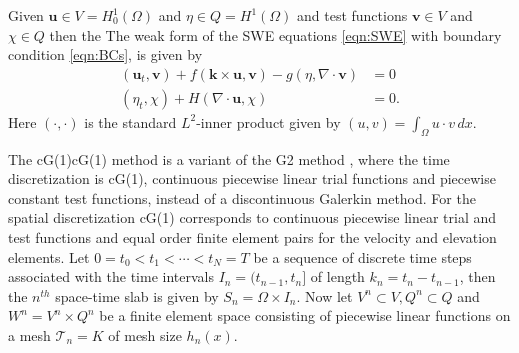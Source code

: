 Given $\mathbf{u} \in V=H^1_0(\Omega)$ and $\eta \in Q=H^1(\Omega)$ and
test functions $\mathbf{v} \in V$ and $\chi \in Q$ then the The weak form of the
SWE equations \eqref{eqn:SWE} with boundary condition \eqref{eqn:BCs}, is given
by
\begin{equation}
  \begin{split}
    (\mathbf{u}_t, \mathbf{v}) + f(\mathbf{k} \times
        \mathbf{u}, \mathbf{v}) - g (\eta, \nabla\cdot \mathbf{v}) &= 0\\
    (\eta_t, \chi) + H (\nabla\cdot \mathbf{u},\chi) &= 0.
  \end{split}
  \label{eqn:WeakSWE}
\end{equation}
Here $(\cdot, \cdot)$ is the standard $L^2$-inner product given by $(u,v) =
\int_{\Omega}\! u\cdot v\, dx$.

The cG(1)cG(1) method is a variant of the G2 method \cite{Johnson1998}, where
the time discretization is cG(1), continuous piecewise linear trial functions
and piecewise constant test functions, instead of a discontinuous Galerkin
method. For the spatial discretization cG(1) corresponds to continuous piecewise
linear trial and test functions and equal order finite element pairs for the
velocity and elevation elements. Let $0 = t_0 < t_1 < \cdots < t_N = T$ be a
sequence of discrete time steps associated with the time intervals $I_n =
(t_{n-1},t_n]$ of length $k_n = t_n - t_{n-1}$, then the $n^{th}$
space-time slab is given by $S_n = \Omega \times I_n$. Now let $V^n \subset V,
Q^n \subset Q$ and $W^n = V^n \times Q^n$ be a finite element space consisting
of piecewise linear functions on a mesh $\mathcal{T}_n = {K}$ of mesh size
$h_n(x)$.

